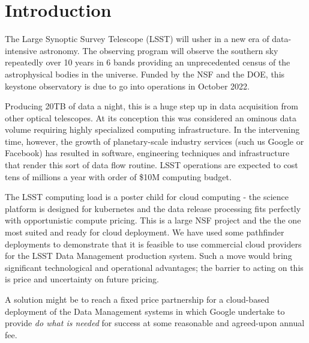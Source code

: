\section{Introduction}
The Large Synoptic Survey Telescope (\gls{LSST}) will usher in a new era of data-intensive astronomy. The observing program will observe the southern sky repeatedly over 10 years in 6 bands providing an unprecedented census of the astrophysical bodies in the universe.  Funded by the \gls{NSF} and the \gls{DOE}, this keystone observatory is due to go into operations in October 2022.

Producing 20TB of data a night, this is a huge step up in data acquisition from other optical telescopes. At its conception this was considered an ominous data volume requiring highly specialized computing infrastructure. In the intervening time, however, the growth of planetary-scale industry services (such us Google or Facebook) has resulted in software, engineering techniques and infrastructure that render this sort of data flow routine. \gls{LSST}  operations are expected to cost tens of millions a year with order of \$10M computing budget.

The \gls{LSST} computing load is a poster child for cloud computing - the science platform is designed for kubernetes and the
data release processing fits perfectly with opportunistic compute pricing. This is a large \gls{NSF} project and the the one most suited and ready for cloud deployment.
We have used some pathfinder deployments to demonstrate that it is feasible to use commercial cloud providers for the \gls{LSST} \gls{Data Management} production system. Such a move would bring significant technological and operational advantages; the barrier to acting on this is price and uncertainty on future pricing.

A solution might be to reach a fixed price partnership for a cloud-based deployment of the \gls{Data Management} systems in which Google undertake to provide \emph{do what is needed} for success at some reasonable and agreed-upon annual fee.






